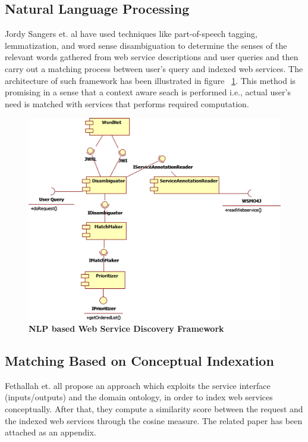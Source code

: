 \documentclass[12pt, oneside]{book}
\begin{document}
\subsection{Natural Language Processing}
Jordy Sangers et. al \cite{nlp} have used techniques like part-of-speech tagging, lemmatization, and word sense disambiguation to determine the senses of the relevant words gathered from web service descriptions and user queries and then carry out a matching process between user's query and indexed web services. The architecture of such framework has been illustrated in figure ~\ref{img: swsd}. This method is promising in a sense that a context aware seach is performed i.e., actual user's need is matched with services that performs required computation.
\begin{figure}[h]
 \centering
 \includegraphics[width=\textwidth]{pics/swsd.png}
 \caption{\textbf{NLP based Web Service Discovery Framework}}
 \label{img: swsd}
\end{figure}


\subsection{Matching Based on Conceptual Indexation}
Fethallah et. all \cite{automated} propose an approach which exploits the service interface (inputs/outputs) and the domain ontology, in order to index web services conceptually. After that, they compute a similarity score between the request and the indexed web services through the cosine measure. The related paper has been attached as an appendix.
\end{document}
